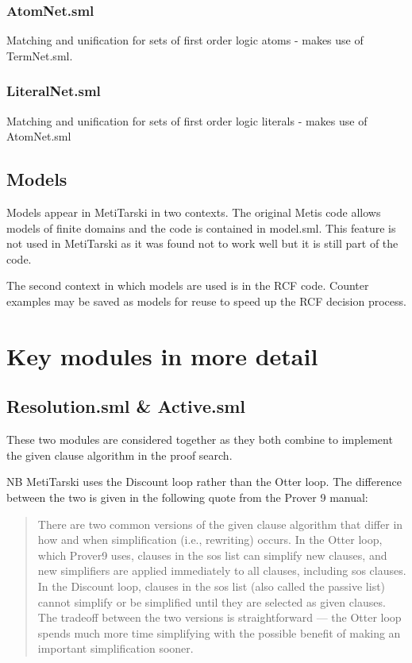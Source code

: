\documentclass[11pt, oneside]{article}   	%
\begin{document}
\subsubsection{AtomNet.sml}

Matching and unification for sets of first order logic atoms - makes use of TermNet.sml.

\subsubsection{LiteralNet.sml}

Matching and unification for sets of first order logic literals - makes use of AtomNet.sml


\subsection{Models}

Models appear in MetiTarski in two contexts. The original Metis code allows models of finite domains and the code is contained in model.sml. This  feature is not used in MetiTarski as it was found not to work well but it is still part of the code.

The second context in which models are used is in the RCF code. Counter examples may be saved as models for reuse to speed up the RCF decision process.

\section{Key modules in more detail}

\subsection{Resolution.sml  \& Active.sml}

These two modules are considered together as they both combine to implement the given clause algorithm in the proof search.

NB MetiTarski uses the Discount loop rather than the Otter loop. The difference between the two is given in the following quote from the Prover 9 manual:

\begin{quote}
There are two common versions of the given clause algorithm that differ in how and when simplification (i.e., rewriting) occurs.
In the Otter loop, which Prover9 uses, clauses in the sos list can simplify new clauses, and new simplifiers are applied immediately to all clauses, including sos clauses.
In the Discount loop, clauses in the sos list (also called the passive list) cannot simplify or be simplified until they are selected as given clauses.
The tradeoff between the two versions is straightforward --- the Otter loop spends much more time simplifying with the possible benefit of making an important simplification sooner.
\end{quote}
\end{document}
